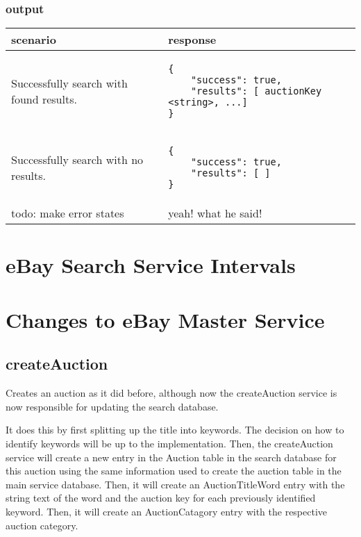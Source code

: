 \documentclass[12pt,a4paper]{article}
\begin{document}
\subsubsection{output}
\begin{center}
    \begin{tabular}{| p{5cm} | l |}
        \hline
        \textbf{scenario} & \textbf{response} \\
        \hline
        Successfully search with found results. &
        \begin{lstlisting}[boxpos=t,language=tablejson,firstnumber=1]
{
    "success": true,
    "results": [ auctionKey <string>, ...]
}
        \end{lstlisting} \\ 
        \hline
 \hline
        Successfully search with no results. &
        \begin{lstlisting}[boxpos=t,language=tablejson,firstnumber=1]
{
    "success": true,
    "results": [ ]
}
        \end{lstlisting} \\ 
        \hline
            todo: make error states & yeah! what he said! \\
        \hline
    \end{tabular}
\end{center}





\section{eBay Search Service Intervals}


\section{Changes to eBay Master Service}

\subsection{createAuction}

Creates an auction as it did before, although now the createAuction service is
now responsible for updating the search database.

It does this by first splitting up the title into keywords. The decision on how
to identify keywords will be up to the implementation. Then, the createAuction
service will create a new entry in the Auction table in the search database for
this auction using the same information used to create the auction table in the
main service database. Then, it will create an AuctionTitleWord entry with the
string text of the word and the auction key for each previously identified
keyword. Then, it will create an AuctionCatagory entry with the respective
auction category.
\end{document}
